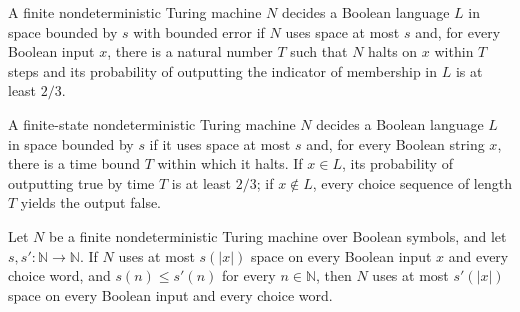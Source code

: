 \begin{definition}
\label{Turing.FinNDTM.BPDecidesInSpace}
\leanok
{}
A finite nondeterministic Turing machine $N$ decides a Boolean language $L$ in space
bounded by $s$ with bounded error if $N$ uses space at most $s$ and, for every Boolean
input $x$, there is a natural number $T$ such that $N$ halts on $x$ within $T$ steps and
its probability of outputting the indicator of membership in $L$ is at least $2/3$.
\end{definition}

\begin{definition}
\label{Turing.FinNDTM.RDecidesInSpace}
\leanok
{}
A finite-state nondeterministic Turing machine $N$ decides a Boolean language $L$ in
space bounded by $s$ if it uses space at most $s$ and, for every Boolean string $x$,
there is a time bound $T$ within which it halts. If $x\in L$, its probability of
outputting true by time $T$ is at least $2/3$; if $x\notin L$, every choice sequence of
length $T$ yields the output false.
\end{definition}

\begin{theorem}
\label{Turing.FinNDTM.UsesSpace.mono}
\leanok
{}
Let $N$ be a finite nondeterministic Turing machine over Boolean symbols, and let
$s,s'\colon\mathbb{N}\to\mathbb{N}$. If $N$ uses at most $s(|x|)$ space on every Boolean
input $x$ and every choice word, and $s(n)\le s'(n)$ for every $n\in\mathbb{N}$, then
$N$ uses at most $s'(|x|)$ space on every Boolean input and every choice word.
\end{theorem}

